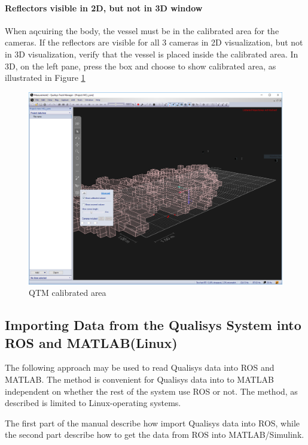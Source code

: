 \documentclass[a4paper,english]{report}
\begin{document}
\paragraph*{Reflectors visible in 2D, but not in 3D window}
When aqcuiring the body, the vessel must be in the calibrated area for the cameras. If the reflectors are visible for all 3 cameras in 2D visualization, but not in 3D visualization, verify that the vessel is placed inside the calibrated area. In 3D, on the left pane, press the box and choose to show calibrated area, as illustrated in Figure \ref{fig:calibrated_area}
\begin{figure}[htb!]
	\centerline{\includegraphics[scale=0.4]{fig/calibrated_area.png}}
	\caption{QTM calibrated area}
	\label{fig:calibrated_area}
\end{figure}
\clearpage{}
\subsection{Importing Data from the Qualisys System into ROS and MATLAB(Linux)}
The following approach may be used to read Qualisys data into ROS and MATLAB. The method is convenient for Qualisys data into to MATLAB independent on whether the rest of the system use ROS or not. The method, as described is limited to Linux-operating systems.

The first part of the manual describe how import Qualisys data into ROS, while the second part describe how to get the data from ROS into MATLAB/Simulink.
\end{document}
